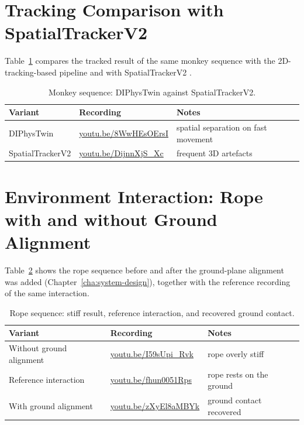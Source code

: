 \section{Tracking Comparison with SpatialTrackerV2}
\label{sec:app-vid-spatracker}

Table~\ref{tab:app-vid-spatracker} compares the tracked result of the same monkey sequence with the
2D-tracking-based pipeline and with SpatialTrackerV2 \parencite{spatrackerv2}.

\begin{table}[H]
    \caption{Monkey sequence: DIPhysTwin against SpatialTrackerV2.}
    \label{tab:app-vid-spatracker}
    \begin{center}
        \small
        \begin{tabular}{@{}p{3.6cm}ll@{}} \toprule
            Variant & Recording & Notes \\ \midrule
            DIPhysTwin & \url{youtu.be/8WwHEsOErsI} & spatial separation on fast movement \\
            SpatialTrackerV2 & \url{youtu.be/DijnnXjS_Xc} & frequent 3D artefacts \\ \bottomrule
        \end{tabular}
    \end{center}
\end{table}

\section{Environment Interaction: Rope with and without Ground Alignment}
\label{sec:app-vid-ground}

Table~\ref{tab:app-vid-ground} shows the rope sequence before and after the ground-plane alignment
was added (Chapter~\ref{cha:system-design}), together with the reference recording of the same
interaction.

\begin{table}[H]
    \caption{Rope sequence: stiff result, reference interaction, and recovered ground contact.}
    \label{tab:app-vid-ground}
    \begin{center}
        \small
        \begin{tabular}{@{}p{5.2cm}ll@{}} \toprule
            Variant & Recording & Notes \\ \midrule
            Without ground alignment & \url{youtu.be/I59sUpi_Rvk}  & rope overly stiff \\
            Reference interaction    & \url{youtu.be/fhun0051Rps}  & rope rests on the ground \\
            With ground alignment    & \url{youtu.be/zXyEl8aMBYk}  & ground contact recovered \\ \bottomrule
        \end{tabular}
    \end{center}
\end{table}

